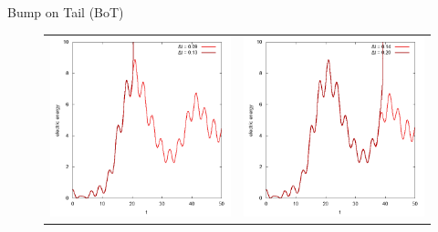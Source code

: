 \documentclass{beamer}
\begin{document}
\begin{frame}{Bump on Tail (BoT)}
{\begin{figure}
\begin{tabular}{cc}
        \includegraphics[scale=0.3]{img/ee_weno_rk44.png} &\hspace{-0.2cm}\includegraphics[scale=0.3]{img/ee_o2_rk44.png}
      \end{tabular}

\end{figure}}
\end{frame}
\end{document}
